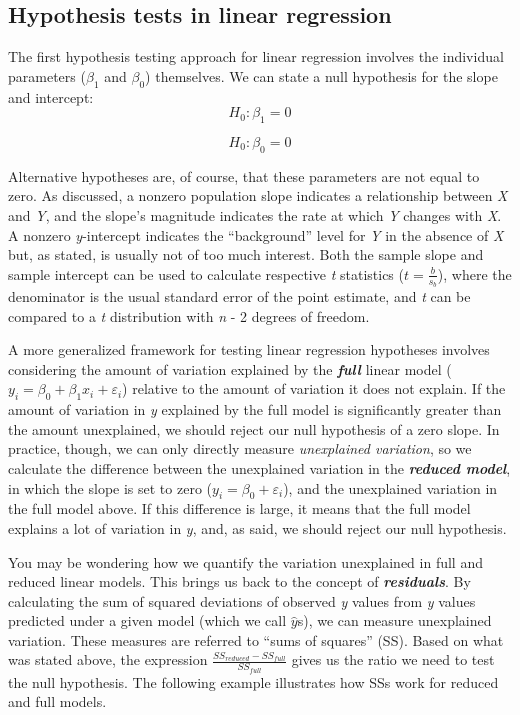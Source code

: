 \documentclass[]{book}
\begin{document}
\hypertarget{hypothesis-tests-in-linear-regression}{%
\subsection{Hypothesis tests in linear regression}\label{hypothesis-tests-in-linear-regression}}

The first hypothesis testing approach for linear regression involves the individual parameters (\(\beta_1\) and \(\beta_0\)) themselves. We can state a null hypothesis for the slope and intercept:
\[H_0:  \beta_1=0\]

\[H_0:  \beta_0=0\]

Alternative hypotheses are, of course, that these parameters are not equal to zero. As discussed, a nonzero population slope indicates a relationship between \emph{X} and \emph{Y}, and the slope's magnitude indicates the rate at which \emph{Y} changes with \emph{X}. A nonzero \emph{y}-intercept indicates the ``background'' level for \emph{Y} in the absence of \emph{X} but, as stated, is usually not of too much interest. Both the sample slope and sample intercept can be used to calculate respective \emph{t} statistics (\(t=\frac{b}{s_b}\)), where the denominator is the usual standard error of the point estimate, and \emph{t} can be compared to a \emph{t} distribution with \emph{n} - 2 degrees of freedom.

A more generalized framework for testing linear regression hypotheses involves considering the amount of variation explained by the \textbf{\emph{full}} linear model (\(y_i=\beta_0+\beta_1x_i+\varepsilon_i\)) relative to the amount of variation it does not explain. If the amount of variation in \emph{y} explained by the full model is significantly greater than the amount unexplained, we should reject our null hypothesis of a zero slope. In practice, though, we can only directly measure \emph{unexplained variation}, so we calculate the difference between the unexplained variation in the \textbf{\emph{reduced model}}, in which the slope is set to zero (\(y_i=\beta_0+\varepsilon_i\)), and the unexplained variation in the full model above. If this difference is large, it means that the full model explains a lot of variation in \emph{y}, and, as said, we should reject our null hypothesis.

You may be wondering how we quantify the variation unexplained in full and reduced linear models. This brings us back to the concept of \textbf{\emph{residuals}}. By calculating the sum of squared deviations of observed \emph{y} values from \emph{y} values predicted under a given model (which we call \(\hat{y}\)s), we can measure unexplained variation. These measures are referred to ``sums of squares'' (SS). Based on what was stated above, the expression \(\frac{SS_{reduced}-SS_{full}}{SS_{full}}\) gives us the ratio we need to test the null hypothesis. The following example illustrates how SSs work for reduced and full models.
\end{document}
